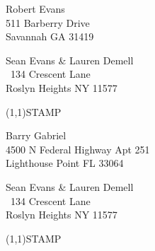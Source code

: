 \documentclass[12pt]{article}
\begin{document}
\begin{center} \begin{Huge} \vspace*{\fill}
Robert Evans\\
511 Barberry Drive\\
Savannah GA 31419\\
\vspace{\fill} \end{Huge} \end{center}

\clearpage

\begin{minipage}{.5\linewidth} \noindent
Sean Evans \& Lauren Demell\\\ 
134 Crescent Lane\\ 
Roslyn Heights NY 11577
\end{minipage}
\begin{minipage}{.5\linewidth \hspace{-.2in} \vspace{-.3in}}
\begin{flushright}
\framebox(1,1){STAMP}
\end{flushright}
\end{minipage}

\begin{center} \begin{Huge} \vspace*{\fill}
Barry Gabriel\\
4500 N Federal Highway Apt 251\\
Lighthouse Point FL 33064\\
\vspace{\fill} \end{Huge} \end{center}

\clearpage

\begin{minipage}{.5\linewidth} \noindent
Sean Evans \& Lauren Demell\\\ 
134 Crescent Lane\\ 
Roslyn Heights NY 11577
\end{minipage}
\begin{minipage}{.5\linewidth \hspace{-.2in} \vspace{-.3in}}
\begin{flushright}
\framebox(1,1){STAMP}
\end{flushright}
\end{minipage}
\end{document}
